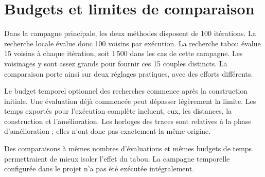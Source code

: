 \section{Budgets et limites de comparaison}
Dans la campagne principale, les deux méthodes disposent de 100 itérations.
La recherche locale évalue donc 100 voisins par exécution. La recherche tabou
évalue 15 voisins à chaque itération, soit 1\,500 dans les cas de cette campagne.
Les voisinages y sont assez grands pour fournir ces 15 couples distincts.
La comparaison porte ainsi sur deux réglages pratiques, avec des efforts différents.

Le budget temporel optionnel des recherches commence après la construction
initiale. Une évaluation déjà commencée peut dépasser légèrement la limite.
Les temps exportés pour l'exécution complète incluent, eux, les distances,
la construction et l'amélioration. Les horloges des traces sont relatives
à la phase d'amélioration ; elles n'ont donc pas exactement la même origine.

Des comparaisons à mêmes nombres d'évaluations et mêmes budgets de temps
permettraient de mieux isoler l'effet du tabou. La campagne temporelle
configurée dans le projet n'a pas été exécutée intégralement.

